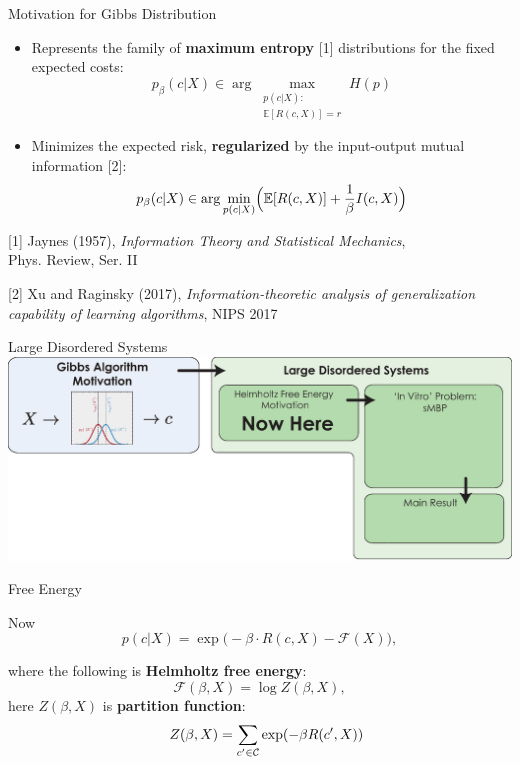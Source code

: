 \documentclass[presentation,12pt]{beamer}
\newcommand{\setroadmapfootline}{%
\setfootline{%
  \textcolor{gray!60}{%
    \tiny\insertshortdate \hfill \insertshortauthor \quad 
    \phantom{\insertframenumber/\inserttotalframenumber}
  }%
}%
}
\newcommand{\Expct}{\mathbb{E}}
\def\C{{\cal C}}
\begin{document}
\begin{frame}{Motivation for Gibbs Distribution}
  \begin{itemize}
  \item Represents the family of \textbf{maximum entropy} [1] distributions for the fixed
  expected costs:
    \[
        p_\beta(c|X) \in \arg \max_{\substack{p(c|X) \colon \\ \Expct[R(c, X)] = r}} H(p)
    \]

  \item Minimizes the expected risk, \textbf{regularized} by the input-output mutual
  information [2]:
    \[
        p_\beta(c|X) \in \arg \min_{p(c|X)} \Bigl( \Expct[R(c, X)] +
          \frac{1}{\beta} I(c, X) \Bigr)
    \]
  \end{itemize}

  \vfill

  {
  \textcolor{gray!60}{
    \scriptsize [1] Jaynes (1957), \textit{Information Theory and Statistical Mechanics},
    \\ Phys. Review, Ser. II }\par

  \textcolor{gray!60}{
    \scriptsize [2] Xu and Raginsky (2017), 
    \textit{Information-theoretic analysis of generalization capability of
      learning algorithms}, NIPS 2017 }\par
  }
\end{frame}

{\setroadmapfootline \begin{frame}[noframenumbering]{Large Disordered Systems}
\centering
\includegraphics[width=\textwidth]{roadmap_after_gibbs} 
\end{frame}}

\begin{frame}{Free Energy}

Now 
\[ p(c|X) = \exp \bigl( -\beta \cdot R(c,X) - \mathcal{F}(X) \bigr), \]

\medskip
where the following is \textbf{Helmholtz free energy}:
\[\mathcal{F}(\beta, X) = \log Z(\beta, X), \]
here $Z(\beta, X)$ is \textbf{partition function}:
\[
\quad Z(\beta, X) = \sum_{c'\in \C} \exp(-\beta R(c', X))
\]

\medskip

        
\end{frame}
\end{document}
